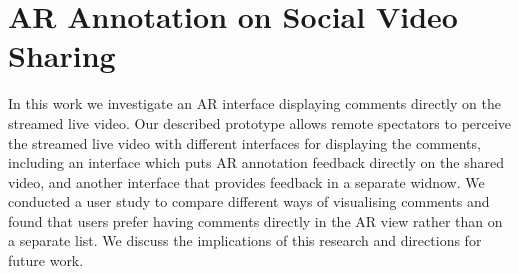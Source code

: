 
\section{AR Annotation on Social Video Sharing}
\label{sec:video}





In this work we investigate an AR interface displaying comments directly on the streamed live video. Our described prototype allows remote spectators to perceive the streamed live video with different interfaces for displaying the comments, including an interface which puts AR annotation feedback directly on the shared video, and another interface that provides feedback in a separate widnow. We conducted a user study to compare different ways of visualising comments and found that users prefer having comments directly in the AR view rather than on a separate list. We discuss the implications of this research and directions for future work.




